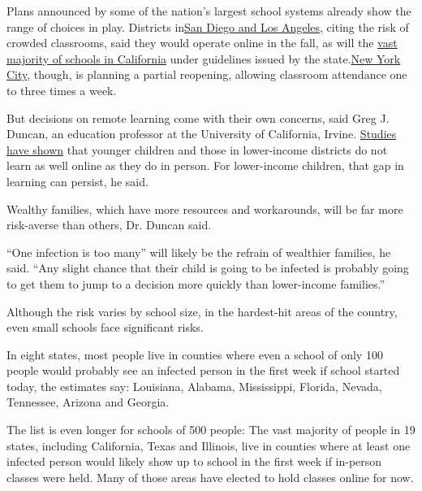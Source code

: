Plans announced by some of the nation's largest school systems already
show the range of choices in play. Districts
in\href{https://www.nytimes.com/2020/07/13/us/lausd-san-diego-school-reopening.html}{}\href{https://www.nytimes.com/2020/07/13/us/lausd-san-diego-school-reopening.html}{San
Diego and Los Angeles}, citing the risk of crowded classrooms, said they
would operate online in the fall, as will the
\href{https://www.nytimes.com/2020/07/17/us/california-schools-reopening-newsom.html}{vast
majority of schools in California} under guidelines issued by the
state.\href{https://www.nytimes.com/2020/07/08/nyregion/nyc-schools-reopening-plan.html}{}\href{https://www.nytimes.com/2020/07/08/nyregion/nyc-schools-reopening-plan.html}{New
York City}, though, is planning a partial reopening, allowing classroom
attendance one to three times a week.

But decisions on remote learning come with their own concerns, said Greg
J. Duncan, an education professor at the University of California,
Irvine.
\href{https://www.nytimes.com/2020/06/05/us/coronavirus-education-lost-learning.html}{Studies
have shown} that younger children and those in lower-income districts do
not learn as well online as they do in person. For lower-income
children, that gap in learning can persist, he said.

Wealthy families, which have more resources and workarounds, will be far
more risk-averse than others, Dr. Duncan said.

``One infection is too many'' will likely be the refrain of wealthier
families, he said. ``Any slight chance that their child is going to be
infected is probably going to get them to jump to a decision more
quickly than lower-income families.''

Although the risk varies by school size, in the hardest-hit areas of the
country, even small schools face significant risks.

In eight states, most people live in counties where even a school of
only 100 people would probably see an infected person in the first week
if school started today, the estimates say: Louisiana, Alabama,
Mississippi, Florida, Nevada, Tennessee, Arizona and Georgia.

The list is even longer for schools of 500 people: The vast majority of
people in 19 states, including California, Texas and Illinois, live in
counties where at least one infected person would likely show up to
school in the first week if in-person classes were held. Many of those
areas have elected to hold classes online for now.

